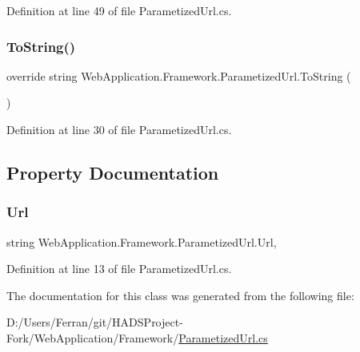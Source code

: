 Definition at line 49 of file Parametized\+Url.\+cs.

\mbox{\label{classWebApplication_1_1Framework_1_1ParametizedUrl_a683634894d4a0b4afea0ce3054d5e035}} 
\subsubsection{\texorpdfstring{ToString()}{ToString()}}
{\footnotesize\ttfamily override string Web\+Application.\+Framework.\+Parametized\+Url.\+To\+String (\begin{DoxyParamCaption}{ }\end{DoxyParamCaption})}



Definition at line 30 of file Parametized\+Url.\+cs.



\subsection{Property Documentation}
\mbox{\label{classWebApplication_1_1Framework_1_1ParametizedUrl_a34be3576c697a64fb6dcc2cc00cb799c}} 
\subsubsection{\texorpdfstring{Url}{Url}}
{\footnotesize\ttfamily string Web\+Application.\+Framework.\+Parametized\+Url.\+Url\hspace{0.3cm}{\ttfamily [get]}, {\ttfamily [set]}}



Definition at line 13 of file Parametized\+Url.\+cs.



The documentation for this class was generated from the following file\+:\begin{DoxyCompactItemize}
\item 
D\+:/\+Users/\+Ferran/git/\+H\+A\+D\+S\+Project-\/\+Fork/\+Web\+Application/\+Framework/\mbox{\hyperlink{ParametizedUrl_8cs}{Parametized\+Url.\+cs}}\end{DoxyCompactItemize}

